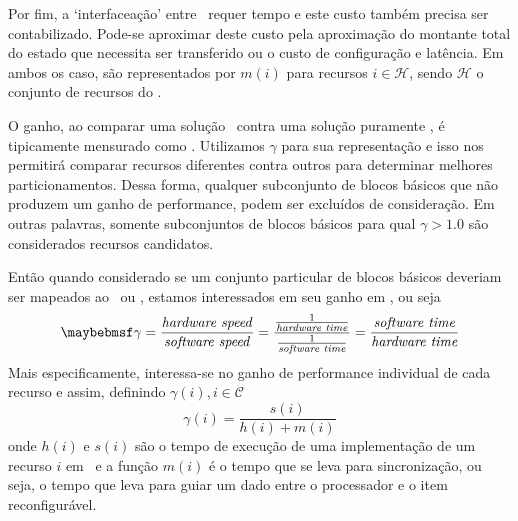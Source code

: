       Por fim, a `interfaceação' entre \hs\ requer tempo e este custo também precisa ser contabilizado.
      Pode-se aproximar deste custo pela aproximação do montante total do estado que necessita ser transferido ou o custo de configuração e latência.
      Em ambos os caso, são representados por $ m(i) $ para recursos $ i \in \mathcal{H} $, sendo $\mathcal{H}$ o conjunto de recursos do \hardware.

      O ganho, ao comparar uma solução \hs\ contra uma solução puramente \software, é tipicamente mensurado como \speedup.
      Utilizamos $ \gamma $ para sua representação e isso nos permitirá comparar recursos diferentes contra outros para determinar melhores particionamentos.
      Dessa forma, qualquer subconjunto de blocos básicos que não produzem um ganho de performance, podem ser excluídos de consideração.
      Em outras palavras, somente subconjuntos de blocos básicos para qual $ \gamma > 1.0 $ são considerados recursos candidatos.

      Então quando considerado se um conjunto particular de blocos básicos deveriam ser mapeados ao \hardware\ ou \software, estamos interessados em seu ganho em \speedup, ou seja
      \begin{equation}
         \gamma =
         \frac{
            \text{\textit{hardware speed}}
         }{
            \text{\textit{software speed}}
         }
         =
         \frac{
            \frac{
               1
            } {
               \text{\textit{hardware time}}
            }
         } {
            \frac{
               1
            }{
               \text{\textit{software time}}
            }
         }
         =
         \frac{
            \text{\textit{software time}}
         } {
            \text{\textit{hardware time}}
         }
      \end{equation}
      Mais especificamente, interessa-se no ganho de performance individual de cada recurso e assim, definindo $ \gamma(i), i \in \mathcal{C} $
      \begin{equation}
         \gamma(i) = \frac{s(i)}{h(i) + m(i)}
      \end{equation}
      onde $ h(i) $ e $ s(i) $ são o tempo de execução de uma implementação de um recurso $ i $ em \hs\ e a função $ m(i) $ é o tempo que se leva para sincronização, ou seja, o tempo que leva para guiar um dado entre o processador e o item reconfigurável.

